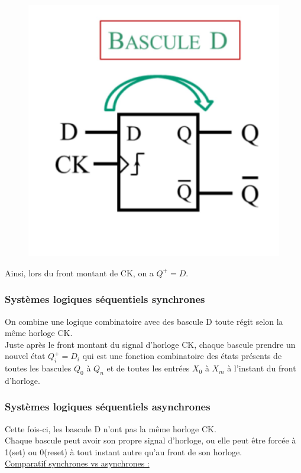 \documentclass[../main.tex]{subfiles}
\begin{document}
\begin{figure}[hbt!]
    \centering
    \includegraphics[width=.6\textwidth]{IMAGES/elec/IMG_0157.jpeg}
\end{figure}

Ainsi, lors du front montant de CK, on a $Q^+ = D$.\\

\subsubsection{Systèmes logiques séquentiels synchrones}
On combine une logique combinatoire avec des bascule D toute régit selon la même horloge CK. \\
Juste après le front montant du signal d'horloge CK, chaque bascule prendre un nouvel état $Q_i^+ = D_i$ qui est une fonction combinatoire des états présents de toutes les bascules $Q_0$ à $Q_n$ et de toutes les entrées $X_0$ à $X_m$ à l'instant du front d'horloge.\\


\subsubsection{Systèmes logiques séquentiels asynchrones}
Cette fois-ci, les bascule D n'ont pas la même horloge CK.\\
Chaque bascule peut avoir son propre signal d'horloge, ou elle peut être forcée à 1(set) ou 0(reset) à tout instant autre qu'au front de son horloge. \\

\quad \underline{Comparatif synchrones vs asynchrones :}\\
\end{document}
